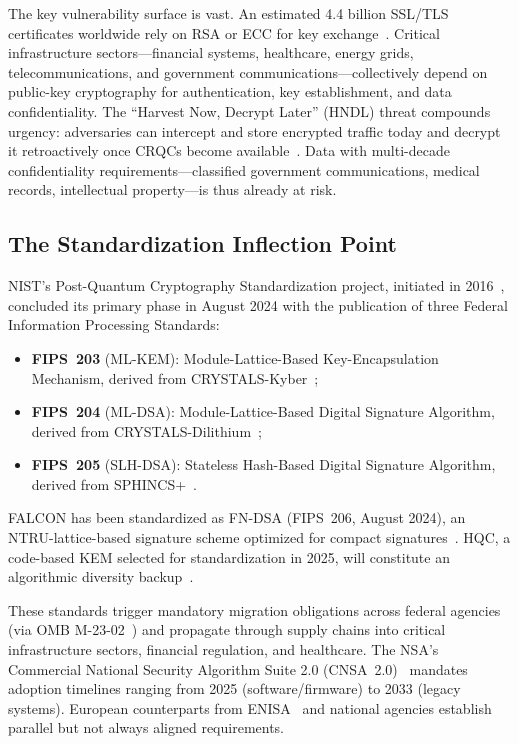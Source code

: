 \documentclass[journal]{IEEEtran}
\begin{document}
The key vulnerability surface is vast. An estimated 4.4 billion SSL/TLS
certificates worldwide rely on RSA or ECC for key exchange~\cite{netcraft2024survey}.
Critical infrastructure sectors---financial systems, healthcare, energy grids,
telecommunications, and government communications---collectively depend on
public-key cryptography for authentication, key establishment, and data
confidentiality. The ``Harvest Now, Decrypt Later'' (HNDL) threat
compounds urgency: adversaries can intercept and store encrypted traffic
today and decrypt it retroactively once CRQCs become available~\cite{chen2016report,
nsasuite2022}. Data with multi-decade confidentiality requirements---classified
government communications, medical records, intellectual property---is thus
already at risk.

\subsection{The Standardization Inflection Point}

NIST's Post-Quantum Cryptography Standardization project, initiated in
2016~\cite{nist2016call}, concluded its primary phase in August 2024 with the
publication of three Federal Information Processing Standards:
\begin{itemize}
  \item \textbf{FIPS~203} (ML-KEM): Module-Lattice-Based Key-Encapsulation
  Mechanism, derived from CRYSTALS-Kyber~\cite{nistfips203};
  \item \textbf{FIPS~204} (ML-DSA): Module-Lattice-Based Digital Signature
  Algorithm, derived from CRYSTALS-Dilithium~\cite{nistfips204};
  \item \textbf{FIPS~205} (SLH-DSA): Stateless Hash-Based Digital Signature
  Algorithm, derived from SPHINCS+~\cite{nistfips205}.
\end{itemize}
FALCON has been standardized as FN-DSA (FIPS~206, August 2024), an NTRU-lattice-based
signature scheme optimized for compact signatures~\cite{nistfips206}.
HQC, a code-based KEM selected for standardization in 2025, will constitute
an algorithmic diversity backup~\cite{aragon2022hqc}.

These standards trigger mandatory migration obligations across federal agencies
(via OMB M-23-02~\cite{omb2023m2302}) and propagate through supply chains
into critical infrastructure sectors, financial regulation, and healthcare.
The NSA's Commercial National Security Algorithm Suite 2.0 (CNSA~2.0)~\cite{nsacnsa2022}
mandates adoption timelines ranging from 2025 (software/firmware) to 2033
(legacy systems). European counterparts from ENISA~\cite{enisa2022pqc} and
national agencies establish parallel but not always aligned requirements.
\end{document}
